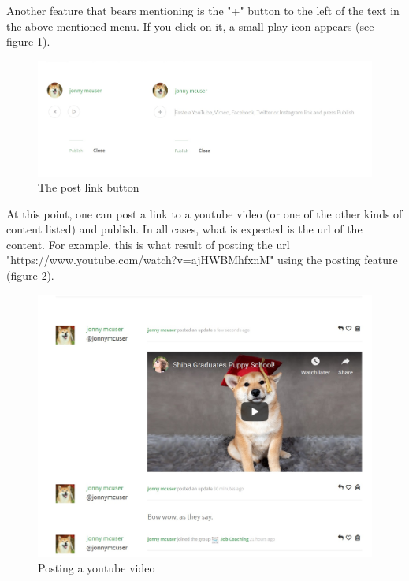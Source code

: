 \documentclass[10pt]{article}
\begin{document}
\begin{flushleft}
Another feature that bears mentioning is the "+" button to the left of the text in the above mentioned menu.  If you click on it, a small play icon appears (see figure \ref{linkpost}).
\end{flushleft}

\begin{figure}[H]
    \centering
    \includegraphics[scale=0.3]{images/linkpost.jpg}
    \caption{The post link button}
    \label{linkpost}
\end{figure}

\begin{flushleft}

At this point, one can post a link to a youtube video (or one of the other kinds of content listed) and publish.  In all cases, what is expected is the url of the content.  For example, this is what result of posting the url "https://www.youtube.com/watch?v=ajHWBMhfxnM" using the posting feature (figure \ref{videopost}).

\end{flushleft}

\begin{figure}[H]
    \centering
    \includegraphics[scale=0.3]{images/puppyschool.jpg}
    \caption{Posting a youtube video}
    \label{videopost}
\end{figure}
\end{document}
